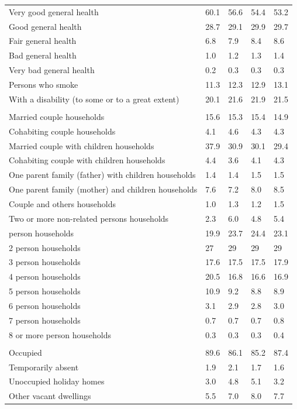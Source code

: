 \documentclass{article}
\begin{document}
\begin{table}[h]
\begin{tabular}{KTTTT}
    \hline
Very good general health & 60.1& 56.6&54.4& 53.2\\
Good general health & 28.7& 29.1& 29.9& 29.7\\
Fair general health & 6.8& 7.9&8.4& 8.6\\
Bad general health & 1.0& 1.2&1.3& 1.4\\
Very bad general health & 0.2& 0.3&0.3& 0.3\\
    \hline
Persons who smoke & 11.3& 12.3&12.9& 13.1\\
    \hline
With a disability (to some or to a great extent) & 20.1& 21.6&21.9& 21.5\\
\hline
    \\ 
    \hline
Married couple households & 15.6& 15.3& 15.4& 14.9\\
Cohabiting couple households & 4.1& 4.6& 4.3& 4.3\\
Married couple with children households & 37.9& 30.9& 30.1& 29.4\\
Cohabiting couple with children households & 4.4& 3.6& 4.1& 4.3\\
One parent family (father) with  children households & 1.4& 1.4& 1.5& 1.5\\
One parent family (mother) and children households & 7.6& 7.2& 8.0& 8.5\\
Couple and others households  & 1.0& 1.3& 1.2& 1.5\\
Two or more non-related persons households & 2.3& 6.0& 4.8& 5.4\\
     person households & 19.9& 23.7& 24.4& 23.1\\
2 person households & 27& 29& 29& 29\\
3 person households & 17.6& 17.5& 17.5& 17.9\\
4 person households & 20.5& 16.8& 16.6& 16.9\\
5 person households & 10.9&  9.2&  8.8&  8.9\\
6 person households & 3.1& 2.9& 2.8& 3.0\\
7 person households & 0.7& 0.7& 0.7& 0.8\\
8 or more person households & 0.3& 0.3& 0.3& 0.4\\
\hline
    \\ 
    \hline
Occupied & 89.6& 86.1& 85.2& 87.4\\
Temporarily absent & 1.9& 2.1& 1.7& 1.6\\
Unoccupied holiday homes & 3.0& 4.8& 5.1& 3.2\\
Other vacant dwellings & 5.5& 7.0& 8.0& 7.7\\
\hline
\end{tabular}
\end{table}
\end{document}
